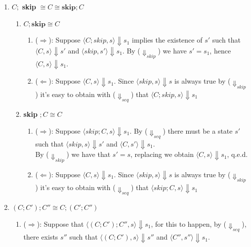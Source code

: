 \begin{solution}
\begin{enumerate}[label=(\alph*)]
    \item $C;$ \textbf{skip} $\cong C \cong \textbf{skip}; C$
    \begin{enumerate}[label=(\alph{enumi}).\arabic*]
       
        \item $C ; \textbf{skip}\cong C$
         \begin{enumerate}[label=(\alph{enumi}).\arabic{enumii}.\arabic*]
            \item ($\Longrightarrow$): Suppose $\langle C; skip, s\rangle \Downarrow s_1$ implies the existence of $s'$ such that $\langle C,s\rangle \Downarrow s'$ and $\langle skip, s'\rangle \Downarrow s_1$. By ($\Downarrow_{skip}$) we have $s'=s_1$, hence $\langle C,s\rangle \Downarrow s_1$.
            \item ($\Longleftarrow$): Suppose $\langle C,s\rangle \Downarrow s_1$. Since $\langle skip,s\rangle \Downarrow s$ is always true by ($\Downarrow_{skip}$) it's easy to obtain with ($\Downarrow_{seq}$) that $\langle C; skip, s\rangle \Downarrow s_1$
        \end{enumerate}
         \item  \textbf{skip} $;C \cong C$
        \begin{enumerate}[label=(\alph{enumi}).\arabic{enumii}.\arabic*]
            \item ($\Longrightarrow$): Suppose $\langle skip;C,s\rangle \Downarrow s_1$. By ($\Downarrow_{seq}$) there must be a state $s'$ such that  $\langle skip, s\rangle \Downarrow s'$ and $\langle C, s'\rangle \Downarrow s_1$. \\ By ($\Downarrow_{skip}$) we have that $s'=s$, replacing we obtain $\langle C,s\rangle \Downarrow s_1$, q.e.d.
            \item ($\Longleftarrow$): Suppose $\langle C,s\rangle \Downarrow s_1$. Since $\langle skip,s\rangle \Downarrow s$ is always true by ($\Downarrow_{skip}$) it's easy to obtain with ($\Downarrow_{seq}$) that $\langle skip;C, s\rangle \Downarrow s_1$
        \end{enumerate}
    \end{enumerate}
    \item $(C;C');C'' \cong C;(C';C'')$
    \begin{enumerate}[label=(\alph{enumi}).\arabic*]
        \item ($   \Longrightarrow$): Suppose that $\langle (C; C');C'', s\rangle \Downarrow s_1$, for this to happen, by ($\Downarrow_{seq}$), there exists $s''$ such that $\langle (C;C'), s\rangle \Downarrow s'' $  and $\langle C'', s''\rangle \Downarrow s_1$.

\end{enumerate}
\end{enumerate}
\end{solution}
